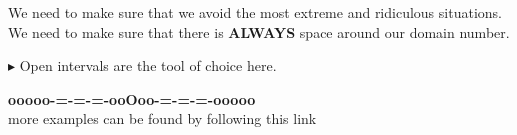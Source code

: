 \documentclass{ximera}
\begin{document}
We need to make sure that we avoid the most extreme and ridiculous situations.  We need to make sure that there is \textbf{\textcolor{red!70!black}{ALWAYS}} space around our domain number.



\textbf{\textcolor{red!70!darkgray}{$\blacktriangleright$}} Open intervals are the tool of choice here.














\begin{center}
\textbf{\textcolor{green!50!black}{ooooo-=-=-=-ooOoo-=-=-=-ooooo}} \\

more examples can be found by following this link\\ 

\end{center}
\end{document}
